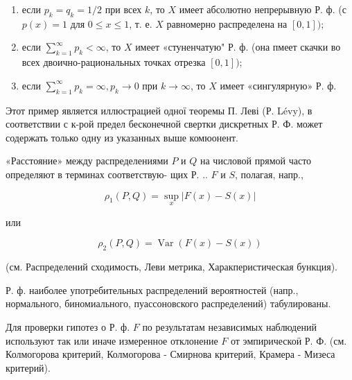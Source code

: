 \documentclass[10pt]{article}
\begin{document}
\begin{enumerate}

  \item если $p_{k}=q_{k}=1 / 2$ при всех $k$, то $X$ имеет абсолютно непрерывную Р. ф. (с $p(x)=1$ для $0 \leqslant x \leqslant 1$, т. е. $X$ равномерно распределена на $[0,1])$;



  \item если $\sum_{k=1}^{\infty} p_{k}<\infty$, то $X$ имеет «стуненчатую" Р. ф. (она пмеет скачки во всех двоично-рациональных точках отрезка $[0,1])$;



  \item если $\sum_{k=1}^{\infty} p_{k}=\infty, p_{k} \rightarrow 0$ при $k \rightarrow \infty$, то $X$ имеет «сингулярную» Р. ф.



\end{enumerate}



Этот пример является иллюстрацией одної теоремы П. Леві (Р. Lévy), в соответствии с к-рой предел бесконечной свертки дискретных Р. Ф. может содержать только одну из указанных выше комюонент.



«Расстояние» между распределениями $P$ и $Q$ на числовой прямой часто определяют в терминах соответствую- щих Р. .. $F$ и $S$, полагая, напр.,



\[

\rho_{1}(P, Q)=\sup _{x}|F(x)-S(x)|

\]



или



\[

\rho_{2}(P, Q)=\operatorname{Var}(F(x)-S(x))

\]



(см. Распределений сходимость, Леви метрика, Харакперистическая бункция).



Р. ф. наиболее употребительных распределений вероятностей (напр., нормального, биномиального, пуассоновского распределений) табулированы.



Для проверки гипотез о Р. ф. $F$ по результатам независимых наблюдений используют так или иначе измеренное отклонение $F$ от эмпирическоӥ Р. Ф. (см. Колмогорова критерий, Колмогорова - Смирнова критерий, Крамера - Мизеса критерий).
\end{document}
